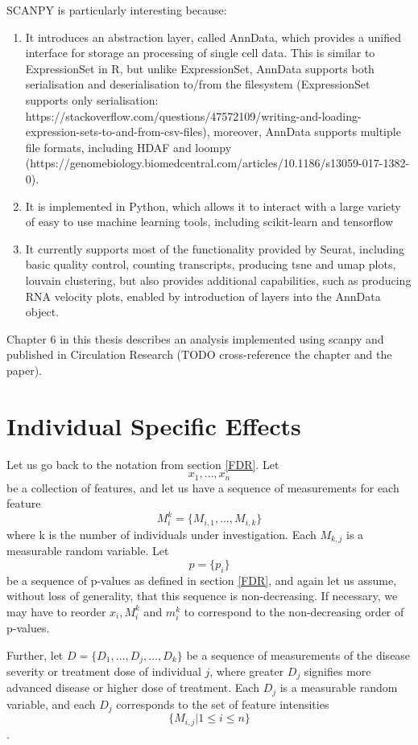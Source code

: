 SCANPY is particularly interesting because:
\begin{enumerate}
\item It introduces an abstraction layer, called AnnData, which provides a unified interface for storage an processing of single cell data. This is similar to ExpressionSet in R, but unlike ExpressionSet, AnnData supports both serialisation and deserialisation to/from the filesystem (ExpressionSet supports only serialisation: https://stackoverflow.com/questions/47572109/writing-and-loading-expression-sets-to-and-from-csv-files), moreover, AnnData supports multiple file formats, including HDAF and loompy (https://genomebiology.biomedcentral.com/articles/10.1186/s13059-017-1382-0).
\item It is implemented in Python, which allows it to interact with a large variety of easy to use machine learning tools, including scikit-learn and tensorflow
\item It currently supports most of the functionality provided by Seurat, including basic quality control, counting transcripts, producing tsne and umap plots, louvain clustering, but also provides additional capabilities, such as producing RNA velocity plots, enabled by introduction of layers into the AnnData object.
\end{enumerate}

Chapter 6 in this thesis describes an analysis implemented using scanpy and published in Circulation Research (TODO cross-reference the chapter and the paper).

\section{Individual Specific Effects} \label{ISE}

Let us go back to the notation from section \ref{FDR}. Let $$x_{1}, \ldots, x_{n}$$ be a collection of features, and let us have a sequence of measurements for each feature
$$M^{k}_{i}=\{M_{i,1}, \ldots, M_{i,k}\}$$
where k is the number of individuals under investigation. Each $M_{k, j}$ is a measurable random variable. Let $$p=\{p_{i}\}$$ be a sequence of p-values as defined in section \ref{FDR}, and again let us assume, without loss of generality, that this sequence is non-decreasing. If necessary, we may have to reorder $x_{i}, M_{i}^{k}$ and $m_{i}^{k}$ to correspond to the non-decreasing order of p-values.

Further, let $D=\{D_{1}, \ldots, D_{j}, \ldots, D_{k}\}$ be a sequence of measurements of the disease severity or treatment dose of individual $j$, where greater $D_{j}$ signifies more advanced disease or higher dose of treatment. Each $D_{j}$ is a measurable random variable, and each $D_{j}$ corresponds to the set of feature intensities $$\{M_{i,j} | 1 \leq i \leq n \}$$.

